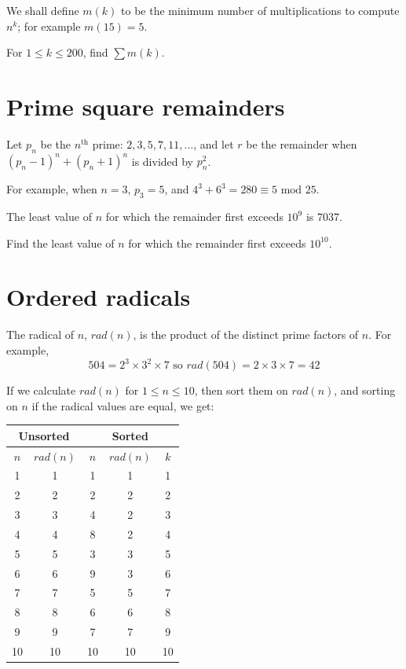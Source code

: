 We shall define $m(k)$ to be the minimum number of multiplications to compute $n^k$; for example $m(15) = 5$.
\medskip

For $1 \leqslant k \leqslant 200$, find $\sum m(k)$.


\section{Prime square remainders} \label{pb.0123}

Let $p_n$ be the $n^{\text{th}}$ prime: $2, 3, 5, 7, 11, ...$, and let $r$ be the remainder when $(p_n-1)^n + (p_n+1)^n$ is divided by $p_n^2$.

For example, when $n = 3$, $p_3 = 5$, and $4^3 + 6^3 = 280 \equiv 5 \text{ mod } 25$.
\medskip

The least value of $n$ for which the remainder first exceeds $10^9$ is 7037.
\medskip

Find the least value of $n$ for which the remainder first exceeds $10^{10}$.


\section{Ordered radicals} \label{pb.0124}

The radical of $n$, $rad(n)$, is the product of the distinct prime factors of $n$. For example, 
$$504 = 2^3 \times 3^2 \times 7 \text{ so } rad(504) = 2 \times 3 \times 7 = 42$$

If we calculate $rad(n)$ for $1 \leqslant n \leqslant 10$, then sort them on $rad(n)$, and sorting on $n$ if the radical values are equal, we get:

\begin{center}
    \begin{tabular}{|c|c||c|c|c|}
        \hline
        \multicolumn{2}{|c||}{Unsorted} & \multicolumn{3}{c|}{Sorted} \\
        \hline
        $n$ & $rad(n)$ & $n$ & $rad(n)$ & $k$\\
        \hline
        1 & 1 & 1 & 1 & 1\\
        \hline
        2 & 2 & 2 & 2 & 2\\
        \hline
        3 & 3 & 4 & 2 & 3\\
        \hline
        4 & 4 & 8 & 2 & 4\\
        \hline
        5 & 5 & 3 & 3 & 5\\
        \hline
        6 & 6 & 9 & 3 & 6\\
        \hline
        7 & 7 & 5 & 5 & 7\\
        \hline
        8 & 8 & 6 & 6 & 8\\
        \hline
        9 & 9 & 7 & 7 & 9\\
        \hline
        10 & 10 & 10 & 10 & 10\\
        \hline
    \end{tabular}
\end{center}

